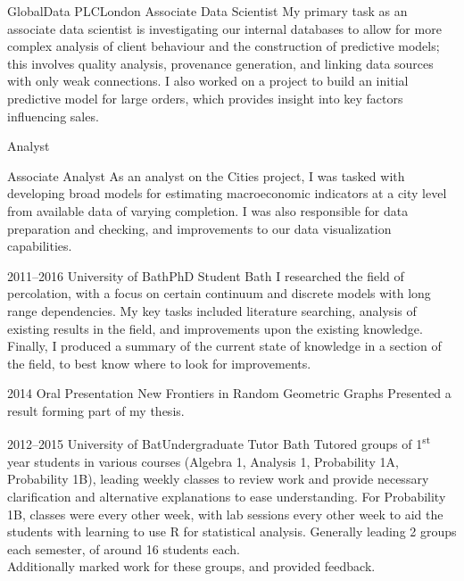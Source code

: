 \documentclass[print, oneside]{friggeri-cv} %
\begin{document}
\begin{entrylist}

\begin{stackedentry}{GlobalData PLC}{London}
{Associate Data Scientist}
{My primary task as an associate data scientist is investigating our internal databases to allow for more complex analysis of client behaviour and the construction of predictive models; this involves quality analysis, provenance generation, and linking data sources with only weak connections. I also worked on a project to build an initial predictive model for large orders, which provides insight into key factors influencing sales.}

{Analyst}
{}

{Associate Analyst}
{As an analyst on the Cities project, I was tasked with developing broad models for estimating macroeconomic indicators at a city level from available data of varying completion. I was also responsible for data preparation and checking, and improvements to our data visualization capabilities.}
\end{stackedentry}

\entry
{2011--2016}
{University of Bath}{PhD Student}
{Bath}
{I researched the field of percolation, with a focus on certain continuum and discrete models with long range dependencies. My key tasks included literature searching, analysis of existing results in the field, and improvements upon the existing knowledge. Finally, I produced a summary of the current state of knowledge in a section of the field, to best know where to look for improvements.}

\entry
{2014}
{Oral Presentation}
{New Frontiers in Random Geometric Graphs}
{Presented a result forming part of my thesis.}




\entry
{2012--2015}
{University of Bat}{Undergraduate Tutor}
{Bath}
{Tutored groups of 1\textsuperscript{st} year students in various courses (Algebra 1, Analysis 1, Probability 1A, Probability 1B), leading weekly classes to review work and provide necessary clarification and alternative explanations to ease understanding. For Probability 1B, classes were every other week, with lab sessions every other week to aid the students with learning to use R for statistical analysis. Generally leading 2 groups each semester, of around 16 students each.\\
Additionally marked work for these groups, and provided feedback.}


\end{entrylist}
\end{document}
